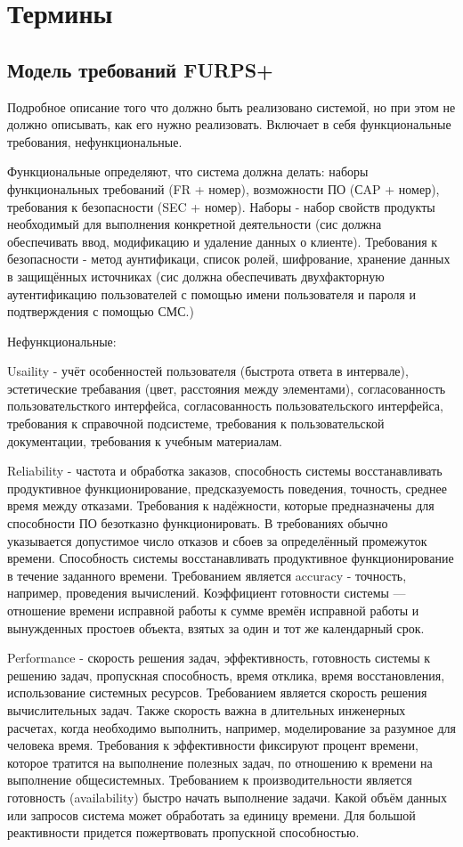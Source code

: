 
\section[Термины]{Термины}
\subsection[Модель требований FURPS+]{Модель требований FURPS+}
Подробное описание того что должно быть реализовано системой, но при этом не должно описывать, как его нужно реализовать.
Включает в себя функциональные требования, нефункциональные. 

Функциональные определяют, что система должна делать: наборы функциональных требований (FR + номер), возможности ПО (СAP + номер), требования к безопасности (SEC + номер).
Наборы - набор свойств продукты необходимый для выполнения конкретной деятельности (сис должна обеспечивать ввод, модификацию и удаление данных о клиенте).
Требования к безопасности - метод аунтификаци, список ролей, шифрование, хранение данных в защищённых источниках (сис должна обеспечивать двухфакторную аутентификацию пользователей с помощью имени пользователя и пароля и подтверждения с помощью СМС.)

Нефункциональные: 

Usaility - учёт особенностей пользователя (быстрота ответа в интервале), эстетические требавания (цвет, расстояния между элементами), согласованность пользовательсткого интерфейса, согласованность пользовательского интерфейса, требования к справочной подсистеме, требования к пользовательской документации, требования к учебным материалам.

Reliability - частота и обработка заказов, способность системы восстанавливать продуктивное функционирование, предсказуемость поведения, точность, среднее время между отказами. Требования к надёжности, которые предназначены для способности ПО безотказно функционировать. 
В требованиях обычно указывается допустимое число отказов и сбоев за определённый промежуток времени. Способность системы восстанавливать продуктивное функционирование в течение заданного времени.
Требованием является accuracy - точность, например, проведения вычислений. Коэффициент готовности системы — отношение времени исправной работы к сумме времён исправной работы и вынужденных простоев объекта, взятых за один и тот же календарный срок.

Performance - скорость решения задач, эффективность, готовность системы к решению задач, пропускная способность, время отклика, время восстановления, использование системных ресурсов.
Требованием является скорость решения вычислительных задач. Также скорость важна в длительных инженерных расчетах, когда необходимо выполнить, например, моделирование за разумное для человека время.
Требования к эффективности фиксируют процент времени, которое тратится на выполнение полезных задач, по отношению к времени на выполнение общесистемных.
Требованием к производительности является готовность (availability) быстро начать выполнение задачи.
Какой объём данных или запросов система может обработать за единицу времени.
Для большой реактивности придется пожертвовать пропускной способностью.

